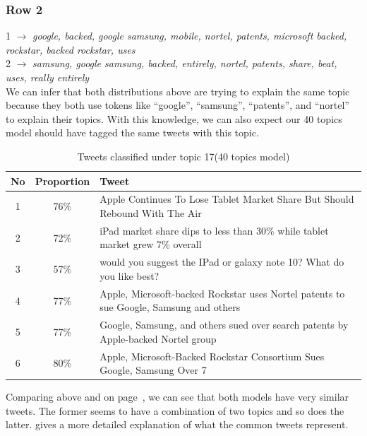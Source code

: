 \subsubsection*{Row 2}
1 $\rightarrow$ \textit{google, backed, google samsung, mobile, nortel, patents, microsoft backed, rockstar, backed rockstar, uses }  \\
2 $\rightarrow$ \textit{samsung, google samsung, backed, entirely, nortel, patents, share, beat, uses, really entirely}   \\

We can infer that both distributions above are trying to explain the same topic because they both
use tokens like ``google'', ``samsung'', ``patents'', and ``nortel'' to explain their topics. With
this knowledge, we can also expect our 40 topics model should have tagged the same tweets with
this topic.

\begin{table}[H]
  \begin{tabular}{c c p{13cm}} \toprule
    No  & Proportion & Tweet \\ \midrule
    1   & 76\%       & Apple Continues To Lose Tablet Market Share But Should Rebound With The Air \\ \midrule
    2   & 72\%       & iPad market share dips to less than 30\% while tablet market grew 7\% overall \\ \midrule
    3   & 57\%       & would you suggest the IPad or galaxy note 10? What do you like best? \\ \midrule
    4   & 77\%       & Apple, Microsoft-backed Rockstar uses Nortel patents to sue Google, Samsung and others \\ \midrule
    5   & 77\%       & Google, Samsung, and others sued over search patents by Apple-backed Nortel group \\ \midrule
    6   & 80\%       & Apple, Microsoft-Backed Rockstar Consortium Sues Google, Samsung Over 7 \\ \bottomrule
  \end{tabular}
  \caption{Tweets classified under topic 17(40 topics model)}
  \label{tab:topic-17-tweets-topic-40}
\end{table}

Comparing  above and  on
page~\pageref{tab:topic-7-tweets}, we can see that both models have very similar tweets. The former
seems to have a combination of two topics and so does the latter.  gives a
more detailed explanation of what the common tweets represent.



